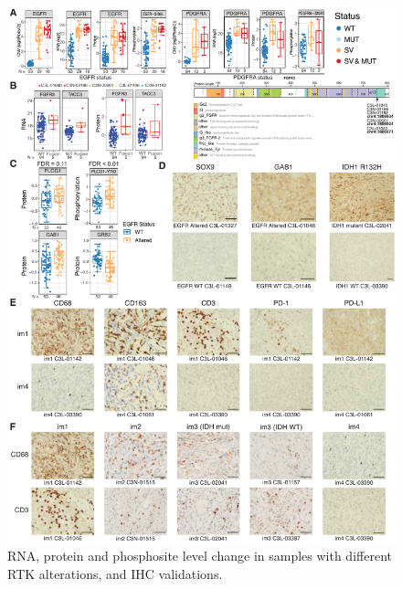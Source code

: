 \begin{figure}[p]
    \centering
    \includegraphics[height=0.93\textheight]{figures/chap04_cptac_gbm_discov/figures4_validation.pdf}
    \caption[RNA, protein and phosphosite level change in samples with different RTK alterations, and IHC validations.]{%
        RNA, protein and phosphosite level change in samples with different RTK alterations, and IHC validations.
        \legendcontdnote
    }
    \label{fig:gbm-rtk-ihc}
\end{figure}
